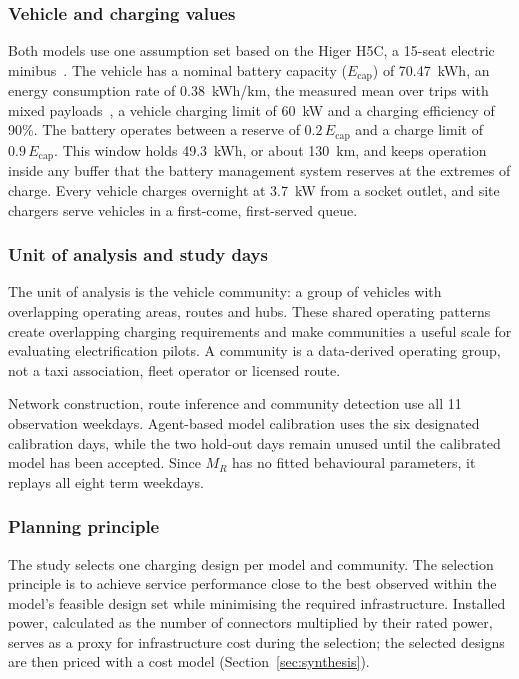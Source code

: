 \documentclass{elsarticle}
\newcommand{\MR}{\ensuremath{M_R}}
\begin{document}
\subsubsection{Vehicle and charging values}
\label{subsubsec:vehicle_assumptions}
Both models use one assumption set based on the Higer H5C, a 15-seat electric minibus~\cite{higer_h5c_ev_2022}. The vehicle has a nominal battery capacity (\( E_\mathrm{cap} \)) of 70.47~kWh, an energy consumption rate of 0.38~kWh/km, the measured mean over trips with mixed payloads~\cite{sello2026_ekamva_performance}, a vehicle charging limit of 60~kW and a charging efficiency of 90\%. The battery operates between a reserve of \( 0.2\,E_\mathrm{cap} \) and a charge limit of \( 0.9\,E_\mathrm{cap} \). This window holds 49.3~kWh, or about 130~km, and keeps operation inside any buffer that the battery management system reserves at the extremes of charge. Every vehicle charges overnight at 3.7~kW from a socket outlet, and site chargers serve vehicles in a first-come, first-served queue.

\subsubsection{Unit of analysis and study days}
\label{subsubsec:unit_of_analysis}

The unit of analysis is the vehicle community: a group of vehicles with overlapping operating areas, routes and hubs. These shared operating patterns create overlapping charging requirements and make communities a useful scale for evaluating electrification pilots. A community is a data-derived operating group, not a taxi association, fleet operator or licensed route.

Network construction, route inference and community detection use all 11 observation weekdays. Agent-based model calibration uses the six designated calibration days, while the two hold-out days remain unused until the calibrated model has been accepted. Since \(\MR\) has no fitted behavioural parameters, it replays all eight term weekdays.

\subsubsection{Planning principle}
The study selects one charging design per model and community. The selection principle is to achieve service performance close to the best observed within the model's feasible design set while minimising the required infrastructure. Installed power, calculated as the number of connectors multiplied by their rated power, serves as a proxy for infrastructure cost during the selection; the selected designs are then priced with a cost model (Section~\ref{sec:synthesis}).
\end{document}
